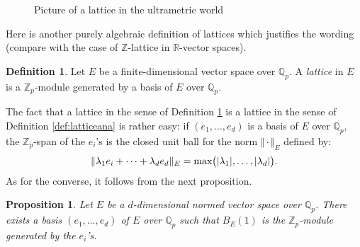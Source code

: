 \documentclass[11pt]{article}
\numberwithin{equation}{section}
\numberwithin{figure}{section}
\newtheorem{prop}[theo]{Proposition}
\theoremstyle{definition}
\newtheorem{deftn}[theo]{Definition}
\newcommand{\Z}{\mathbb Z}
\newcommand{\Zp}{\Z_p}
\newcommand{\Q}{\mathbb Q}
\newcommand{\Qp}{\Q_p}
\newcommand{\R}{\mathbb R}
\renewcommand{\max}{\text{\rm max}}
\begin{document}
\begin{figure}
\hfill
{}
\hfill \null

\caption{Picture of a lattice in the ultrametric world}
\label{fig:lattice}
\end{figure}

\medskip

Here is another purely algebraic definition of lattices which justifies
the wording (compare with the case of $\Z$-lattice in $\R$-vector
spaces).

\begin{deftn}
\label{def:latticealg}
Let $E$ be a finite-dimensional vector space over $\Qp$.
A \emph{lattice} in $E$ is a $\Zp$-module generated by a basis of $E$ 
over $\Qp$.
\end{deftn}

\noindent
The fact that a lattice in the sense of Definition \ref{def:latticealg}
is a lattice in the sense of Definition \ref{def:latticeana} is rather
easy: if $(e_1, \ldots, e_d)$ is a basis of $E$ over $\Qp$, the 
$\Zp$-span of the $e_i$'s is the closed unit ball for the norm 
$\Vert \cdot \Vert_E$ defined by:
$$\Vert \lambda_1 e_i + \cdots + \lambda_d e_d \Vert_E =
\max\big(|\lambda_1|, \ldots, |\lambda_d|\big).$$
As for the converse, it follows from the next proposition.

\begin{prop}
\label{prop:nakayama}
Let $E$ be a $d$-dimensional normed vector space over $\Qp$.
There exists a basis $(e_1, \ldots, e_d)$ of $E$ over $\Qp$ such 
that $B_E(1)$ is the $\Zp$-module generated by the $e_i$'s.
\end{prop}
\end{document}
